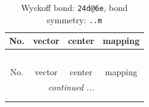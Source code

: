 \documentclass[fleqn,8pt]{jsarticle}
\begin{document}
\renewcommand{\arraystretch}{1.2}
\begin{longtable}{cccc}
\caption{Wyckoff bond: {\tt 24d@6e}, bond symmetry: {\tt ..m}}
 \\
 \hline \hline
No. & vector & center & mapping \\ \hline \endfirsthead

\multicolumn{3}{l}{\tablename\ \thetable{}} \\
 \hline \hline
No. & vector & center & mapping \\ \hline \endhead

 \hline \hline
\multicolumn{3}{r}{\footnotesize\it continued ...} \\ \endfoot

 \hline \hline
\multicolumn{3}{r}{} \\ \endlastfoot


\end{longtable}
\end{document}

